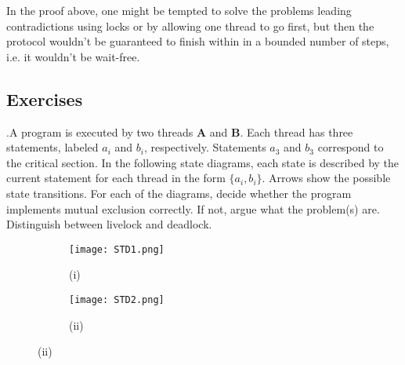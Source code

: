 \documentclass[main]{subfiles}
\begin{document}
In the proof above, one might be tempted to solve the problems leading contradictions using locks or by allowing one thread to go first, but then the protocol wouldn't be guaranteed to finish within in a bounded number of steps, i.e. it wouldn't be wait-free.
 
\newpage


\subsection{Exercises}
    \begin{ExerciseList}
        
        \Exercise[title={Mutual Exclusion},label=MEI].\quad A program is executed by two threads \textbf{A} and \textbf{B}. Each thread has three statements, labeled $a_i$ and $b_i$, respectively. Statements $a_3$ and $b_3$ correspond to the critical section. In the following state diagrams, each state is described by the current statement for each thread in the form $\{a_i,b_i\}$. Arrows show the possible state transitions. For each of the diagrams, decide whether the program implements mutual exclusion correctly. If not, argue what the problem(s) are. Distinguish between livelock and deadlock.
                
            \begin{figure}[H]
                \centering
                \begin{subfigure}{.5\textwidth}
                    \centering
                    \texttt{[image: STD1.png]}
                    \captionsetup{labelformat=empty}
                    \caption{(i)}
                \end{subfigure}%
                \begin{subfigure}{.5\textwidth}
                    \centering
                    \texttt{[image: STD2.png]}
                    \captionsetup{labelformat=empty}
                    \caption{(ii)}
                \end{subfigure}
            \end{figure}
            

\end{ExerciseList}
\end{document}
